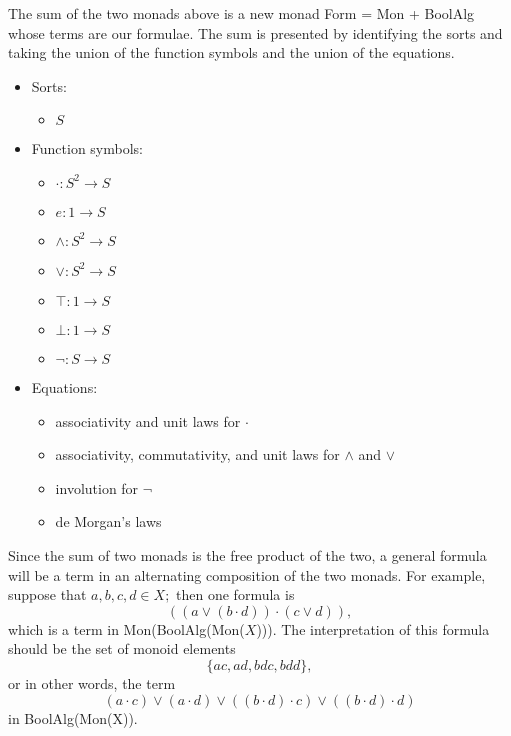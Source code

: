 \documentclass{article}
\newcommand{\maps}{\colon}
\begin{document}
The sum of the two monads above is a new monad Form = Mon + BoolAlg whose terms are our formulae.  The sum is presented by identifying the sorts and taking the union of the function symbols and the union of the equations.
\begin{center}
  \begin{itemize}
    \item Sorts:
    \begin{itemize}
      \item $S$
    \end{itemize}
    \item Function symbols:
    \begin{itemize}
      \item $\cdot\maps S^2 \to S$
      \item $e\maps 1 \to S$
      \item $\land\maps S^2 \to S$
      \item $\lor\maps S^2 \to S$
      \item $\top\maps 1 \to S$
      \item $\bot\maps 1 \to S$
      \item $\neg\maps S \to S$
    \end{itemize}
    \item Equations:
    \begin{itemize}
      \item associativity and unit laws for $\cdot$
      \item associativity, commutativity, and unit laws for $\land$ and $\lor$
      \item involution for $\neg$
      \item de Morgan's laws
    \end{itemize}
  \end{itemize}
\end{center}
Since the sum of two monads is the free product of the two, a general formula will be a term in an alternating composition of the two monads.  For example, suppose that $a, b, c, d \in X;$ then one formula is
\[ (({a}\lor{(b \cdot d)}) \cdot ({c}\lor{d})), \]
which is a term in Mon(BoolAlg(Mon($X$))).  The interpretation of this formula should be the set of monoid elements
\[ \{ ac, ad, bdc, bdd \}, \]
or in other words, the term
\[ (a \cdot c) \lor (a \cdot d) \lor ((b \cdot d) \cdot c) \lor ((b \cdot d) \cdot d) \]
in BoolAlg(Mon(X)).
\end{document}
